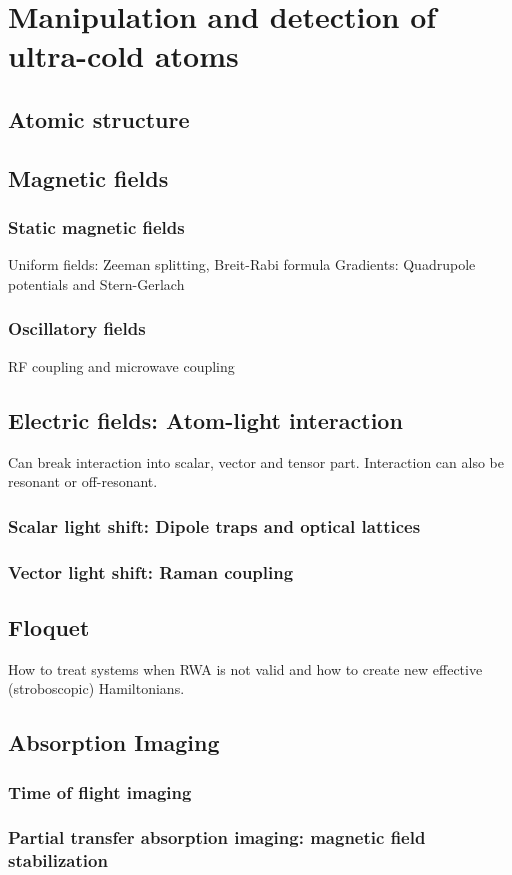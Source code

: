 


\renewcommand{\thechapter}{3}



\chapter{Manipulation and detection of ultra-cold atoms}

\section{Atomic structure}

\section{Magnetic fields}
\subsection{Static magnetic fields}
Uniform fields: Zeeman splitting, Breit-Rabi formula
Gradients: Quadrupole potentials and Stern-Gerlach

\subsection{Oscillatory fields}
RF coupling and microwave coupling

\section{Electric fields: Atom-light interaction}

Can break interaction into scalar, vector and tensor part. Interaction can also be resonant or off-resonant.

\subsection{Scalar light shift: Dipole traps and optical lattices}

\subsection{Vector light shift: Raman coupling}

\section{Floquet}
How to treat systems when RWA is not valid and how to create new effective (stroboscopic) Hamiltonians.

\section{Absorption Imaging}
\subsection{Time of flight imaging}
\subsection{Partial transfer absorption imaging: magnetic field stabilization}










